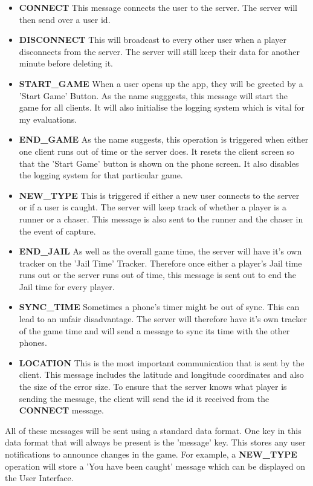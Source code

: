 \documentclass{l4proj}
\begin{document}
\begin{itemize}
    \item \textbf{CONNECT} This message connects the user to the server. The server will then send over a user id.
    \item \textbf{DISCONNECT} This will broadcast to every other user when a player disconnects from the server. The server will still keep their data for another minute before deleting it.
    \item \textbf{START\_GAME} When a user opens up the app, they will be greeted by a 'Start Game' Button. As the name sugggests,
    this message will start the game for all clients. It will also initialise the logging system which is vital for my evaluations.
    \item \textbf{END\_GAME} As the name suggests, this operation is triggered when either one client runs out of time or the server
    does. It resets the client screen so that the 'Start Game' button is shown on the phone screen. It also disables the logging system
    for that particular game.
    \item \textbf{NEW\_TYPE} This is triggered if either a new user connects to the server or if a user is caught. The server will keep track of whether a player is a runner or a chaser. This message is also sent
    to the runner and the chaser in the event of capture.
    \item \textbf{END\_JAIL} As well as the overall game time, the server will have it's own tracker on the 'Jail Time' Tracker. Therefore once either a player's Jail time runs out or the server runs
    out of time, this message is sent out to end the Jail time for every player.
    \item \textbf{SYNC\_TIME} Sometimes a phone's timer might be out of sync. This can lead to an unfair disadvantage. The server will therefore have it's own tracker of the game time and will send a message to sync its time with the other phones.
    \item \textbf{LOCATION} This is the most important communication that is sent by the client. This message 
    includes the latitude and longitude coordinates and also the size of the error size. To ensure that the server knows what player is sending the message, the client will send the id it received from the \textbf{CONNECT} message. 
\end{itemize}

All of these messages will be sent using a standard data format. One key in this data format that will always be present is the
'message' key. This stores any user notifications to announce changes in the game. For example, a 
\textbf{NEW\_TYPE} operation will store a 'You have been caught' message which can be displayed on the User Interface.
\end{document}
